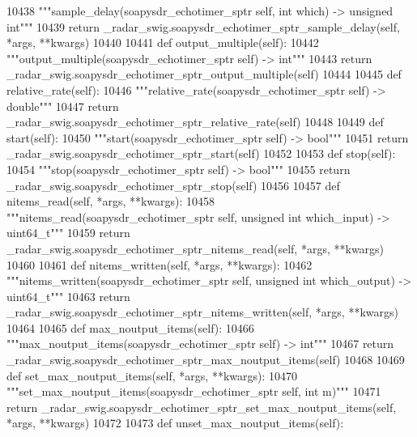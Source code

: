 \begin{DoxyCode}
{{{{{{{{{{{{{{{{{{{{{{{{{{{{{{{{{10438         \textcolor{stringliteral}{"""sample\_delay(soapysdr\_echotimer\_sptr self, int which) -> unsigned int"""}
10439         \textcolor{keywordflow}{return} \_radar\_swig.soapysdr\_echotimer\_sptr\_sample\_delay(self, *args, **kwargs)
10440 
10441     \textcolor{keyword}{def }output_multiple(self):
10442         \textcolor{stringliteral}{"""output\_multiple(soapysdr\_echotimer\_sptr self) -> int"""}
10443         \textcolor{keywordflow}{return} \_radar\_swig.soapysdr\_echotimer\_sptr\_output\_multiple(self)
10444 
10445     \textcolor{keyword}{def }relative_rate(self):
10446         \textcolor{stringliteral}{"""relative\_rate(soapysdr\_echotimer\_sptr self) -> double"""}
10447         \textcolor{keywordflow}{return} \_radar\_swig.soapysdr\_echotimer\_sptr\_relative\_rate(self)
10448 
10449     \textcolor{keyword}{def }start(self):
10450         \textcolor{stringliteral}{"""start(soapysdr\_echotimer\_sptr self) -> bool"""}
10451         \textcolor{keywordflow}{return} \_radar\_swig.soapysdr\_echotimer\_sptr\_start(self)
10452 
10453     \textcolor{keyword}{def }stop(self):
10454         \textcolor{stringliteral}{"""stop(soapysdr\_echotimer\_sptr self) -> bool"""}
10455         \textcolor{keywordflow}{return} \_radar\_swig.soapysdr\_echotimer\_sptr\_stop(self)
10456 
10457     \textcolor{keyword}{def }nitems_read(self, *args, **kwargs):
10458         \textcolor{stringliteral}{"""nitems\_read(soapysdr\_echotimer\_sptr self, unsigned int which\_input) -> uint64\_t"""}
10459         \textcolor{keywordflow}{return} \_radar\_swig.soapysdr\_echotimer\_sptr\_nitems\_read(self, *args, **kwargs)
10460 
10461     \textcolor{keyword}{def }nitems_written(self, *args, **kwargs):
10462         \textcolor{stringliteral}{"""nitems\_written(soapysdr\_echotimer\_sptr self, unsigned int which\_output) -> uint64\_t"""}
10463         \textcolor{keywordflow}{return} \_radar\_swig.soapysdr\_echotimer\_sptr\_nitems\_written(self, *args, **kwargs)
10464 
10465     \textcolor{keyword}{def }max_noutput_items(self):
10466         \textcolor{stringliteral}{"""max\_noutput\_items(soapysdr\_echotimer\_sptr self) -> int"""}
10467         \textcolor{keywordflow}{return} \_radar\_swig.soapysdr\_echotimer\_sptr\_max\_noutput\_items(self)
10468 
10469     \textcolor{keyword}{def }set_max_noutput_items(self, *args, **kwargs):
10470         \textcolor{stringliteral}{"""set\_max\_noutput\_items(soapysdr\_echotimer\_sptr self, int m)"""}
10471         \textcolor{keywordflow}{return} \_radar\_swig.soapysdr\_echotimer\_sptr\_set\_max\_noutput\_items(self, *args, **kwargs)
10472 
10473     \textcolor{keyword}{def }unset_max_noutput_items(self):
}}}}}}}}}}}}}}}}}}}}}}}}}}}}}}}}}
\end{DoxyCode}
